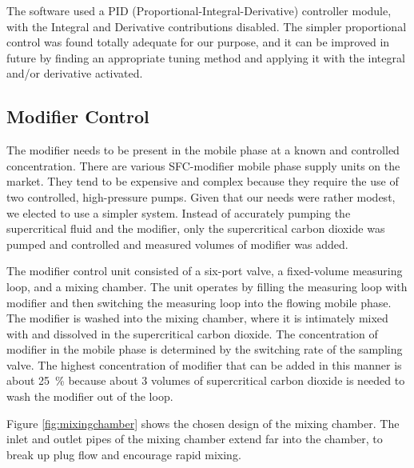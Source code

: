 The software used a PID (Proportional-Integral-Derivative) controller module,
with the Integral and Derivative contributions disabled. The simpler
proportional control was found totally adequate for our purpose, and it can be
improved in future by finding an appropriate tuning method and applying it with
the integral and/or derivative activated.



\subsection{Modifier Control}
\label{secModifierControl}
The modifier needs to be present in the mobile phase at a known and controlled
concentration. There are various SFC-modifier mobile phase supply units on the
market. They tend to be expensive and complex because they require the use of
two controlled, high-pressure pumps. Given that our needs were rather modest, we
elected to use a simpler system. Instead of accurately pumping the supercritical
fluid and the modifier, only the supercritical carbon dioxide was pumped and
controlled and measured volumes of modifier was added.

The modifier control unit consisted of a six-port valve, a fixed-volume
measuring loop, and a mixing chamber. The unit operates by filling the measuring
loop with modifier and then switching the measuring loop into the flowing mobile
phase. The modifier is washed into the mixing chamber, where it is intimately
mixed with and dissolved in the supercritical carbon dioxide. The concentration
of modifier in the mobile phase is determined by the switching rate of the
sampling valve. The highest concentration of modifier that can be added in this
manner is about \SI{25}{\percent} because about 3 volumes of supercritical
carbon dioxide is needed to wash the modifier out of the loop.

Figure \ref{fig:mixingchamber} shows the chosen design of the mixing chamber.
The inlet and outlet pipes of the mixing chamber extend far into the chamber, to
break up plug flow and encourage rapid mixing.  

